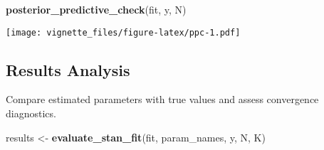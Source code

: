 \documentclass[
]{article}
\newenvironment{Shaded}{\begin{snugshade}}{\end{snugshade}}
\newcommand{\FunctionTok}[1]{\textcolor[rgb]{0.13,0.29,0.53}{\textbf{#1}}}
\newcommand{\NormalTok}[1]{#1}
\newcommand{\OtherTok}[1]{\textcolor[rgb]{0.56,0.35,0.01}{#1}}
\begin{document}
\begin{Shaded}
\begin{Highlighting}[]
\FunctionTok{posterior\_predictive\_check}\NormalTok{(fit, y, N)}
\end{Highlighting}
\end{Shaded}

\texttt{[image: vignette\_files/figure-latex/ppc-1.pdf]}

\subsection{Results Analysis}\label{results-analysis}

Compare estimated parameters with true values and assess convergence
diagnostics.

\begin{Shaded}
\begin{Highlighting}[]
\NormalTok{results }\OtherTok{\textless{}{-}} \FunctionTok{evaluate\_stan\_fit}\NormalTok{(fit, param\_names, y, N, K)}
\end{Highlighting}
\end{Shaded}
\end{document}
